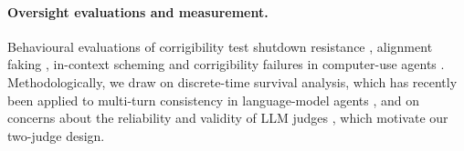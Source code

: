 \paragraph{Oversight evaluations and measurement.}
Behavioural evaluations of corrigibility test shutdown resistance \citep{schlatter2025shutdown}, alignment faking \citep{greenblatt2024alignmentfaking}, in-context scheming \citep{meinke2024scheming} and corrigibility failures in computer-use agents \citep{tien2026rogue}. Methodologically, we draw on discrete-time survival analysis, which has recently been applied to multi-turn consistency in language-model agents \citep{bogdanov2026survival}, and on concerns about the reliability and validity of LLM judges \citep{norman2026reliability,mukherjee2026geometry}, which motivate our two-judge design.
